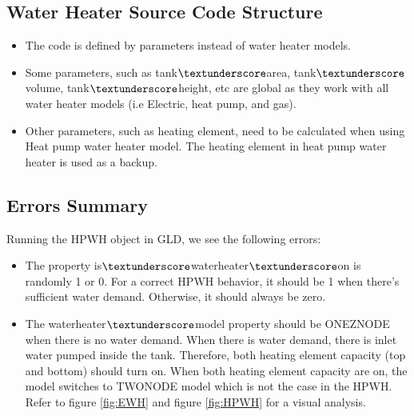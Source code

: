 \subsection{Water Heater Source Code Structure}
\begin{itemize}
    \item The code is defined by parameters instead of water heater models. 
    \item Some parameters, such as tank$\textunderscore$area, tank$\textunderscore$volume, tank$\textunderscore$height, etc are global as they work with all water heater models (i.e Electric, heat pump, and gas).
    \item Other parameters, such as heating element, need to be calculated when using Heat pump water heater model. The heating element in heat pump water heater is used as a backup.
\end{itemize}
\subsection{Errors Summary}
Running the HPWH object in GLD, we see the following errors:
\begin{itemize}
    \item The property is$\textunderscore$waterheater$\textunderscore$on is randomly 1 or 0. For a correct HPWH behavior, it should be 1 when there's sufficient water demand. Otherwise, it should always be zero.
    \item The waterheater$\textunderscore$model property should be ONEZNODE when there is no water demand. When there is water demand, there is inlet water pumped inside the tank. Therefore, both heating element capacity (top and bottom) should turn on. When both heating element capacity are on, the model switches to TWONODE model which is not the case in the HPWH. Refer to figure \ref{fig:EWH} and figure \ref{fig:HPWH} for a visual analysis.
\end{itemize}
